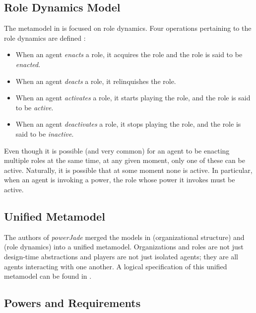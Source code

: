 \subsection*{Role Dynamics Model}

The metamodel in \cite{Dastani04} is focused on role dynamics.
Four operations pertaining to the role dynamics are defined \cite{Dastani04}:
\begin{itemize}
	\item When an agent \textit{enacts} a role, it acquires the role and the role is said to be \textit{enacted}.
	\item When an agent \textit{deacts} a role, it relinquishes the role.
	\item When an agent \textit{activates} a role, it starts playing the role, and the role is said to be \textit{active}.
	\item When an agent \textit{deactivates} a role, it stops playing the role, and the role is said to be \textit{inactive}.
\end{itemize}

Even though it is possible (and very common) for an agent to be enacting multiple roles at the same time, at any given moment, only one of these can be active.
Naturally, it is possible that at some moment none is active.
In particular, when an agent is invoking a power, the role whose power it invokes must be active.

\subsection*{Unified Metamodel}

The authors of \textit{powerJade} merged the models in \cite{Boella04} (organizational structure) and \cite{Boella04} (role dynamics) into a unified metamodel.
Organizations and roles are not just design-time abstractions and players are not just isolated agents; they are all agents interacting with one another.
A logical specification of this unified metamodel can be found in \cite{Boella07}.

\subsection*{Powers and Requirements}

